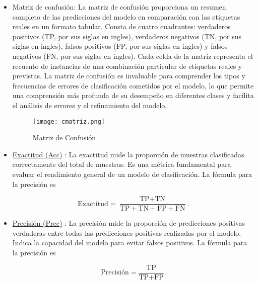 \documentclass[10pt, oneside, a4paper]{article}
\begin{document}
	\begin{itemize}
		\item Matriz de confusión: La matriz de confusión proporciona un resumen completo de las predicciones del modelo en comparación con las etiquetas reales en un formato tabular. Consta de cuatro cuadrantes: verdaderos positivos (TP, por sus siglas en ingles), verdaderos negativos (TN, por sus siglas en ingles), falsos positivos (FP, por sus siglas en ingles) y falsos negativos (FN, por sus siglas en ingles). Cada celda de la matriz representa el recuento de instancias de una combinación particular de etiquetas reales y previstas. La matriz de confusión es invaluable para comprender los tipos y frecuencias de errores de clasificación cometidos por el modelo, lo que permite una comprensión más profunda de su desempeño en diferentes clases y facilita el análisis de errores y el refinamiento del modelo.
		
		\begin{figure}[H]
		\centering
		\texttt{[image: cmatriz.png]}
		\caption{Matriz de Confusión}
		\label{fig:matriz_confusion}
		\end{figure}	
		
		\item \href{https://scikit-learn.org/stable/modules/generated/sklearn.metrics.accuracy_score.html}{Exactitud (Acc)}  \cite{muller2022guideline}: La exactitud mide la proporción de muestras clasificadas correctamente del total de muestras. Es una métrica fundamental para evaluar el rendimiento general de un modelo de clasificación. La fórmula para la precisión es
		
		\begin{equation}\label{eq:accuracy}
			\text{Exactitud} = \frac{\text{TP} + \text{TN}}{\text{TP} + \text{TN} + \text{FP} + \text{FN}}.
		\end{equation}

		
		\item \href{https://scikit-learn.org/stable/modules/generated/sklearn.metrics.precision_score.html}{Precisión (Prec)} : La precisión mide la proporción de predicciones positivas verdaderas entre todas las predicciones positivas realizadas por el modelo. Indica la capacidad del modelo para evitar falsos positivos. La fórmula para la precisión es
		
		\begin{equation}\label{eq:precision}
			\text{Precisión} = \frac{\text{TP}}{\text{TP} + \text{FP}}.
		\end{equation}
		

\end{itemize}
\end{document}
